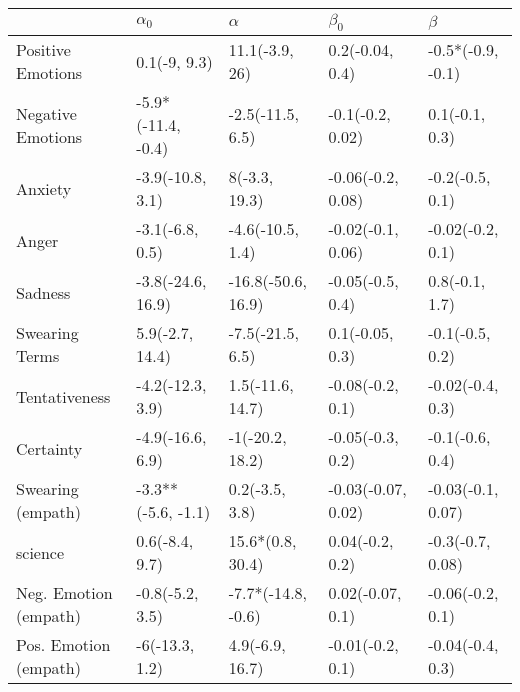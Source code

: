 \begin{tabular}{lllll}
\toprule
{} &          $\alpha_0$ &            $\alpha$ &           $\beta_0$ &            $\beta$ \\
\midrule
Positive Emotions     &        0.1(-9, 9.3) &      11.1(-3.9, 26) &     0.2(-0.04, 0.4) &  -0.5*(-0.9, -0.1) \\
Negative Emotions     &  -5.9*(-11.4, -0.4) &    -2.5(-11.5, 6.5) &    -0.1(-0.2, 0.02) &     0.1(-0.1, 0.3) \\
Anxiety               &    -3.9(-10.8, 3.1) &       8(-3.3, 19.3) &   -0.06(-0.2, 0.08) &    -0.2(-0.5, 0.1) \\
Anger                 &     -3.1(-6.8, 0.5) &    -4.6(-10.5, 1.4) &   -0.02(-0.1, 0.06) &   -0.02(-0.2, 0.1) \\
Sadness               &   -3.8(-24.6, 16.9) &  -16.8(-50.6, 16.9) &    -0.05(-0.5, 0.4) &     0.8(-0.1, 1.7) \\
Swearing Terms        &     5.9(-2.7, 14.4) &    -7.5(-21.5, 6.5) &     0.1(-0.05, 0.3) &    -0.1(-0.5, 0.2) \\
Tentativeness         &    -4.2(-12.3, 3.9) &    1.5(-11.6, 14.7) &    -0.08(-0.2, 0.1) &   -0.02(-0.4, 0.3) \\
Certainty             &    -4.9(-16.6, 6.9) &     -1(-20.2, 18.2) &    -0.05(-0.3, 0.2) &    -0.1(-0.6, 0.4) \\
Swearing (empath)     &  -3.3**(-5.6, -1.1) &      0.2(-3.5, 3.8) &  -0.03(-0.07, 0.02) &  -0.03(-0.1, 0.07) \\
science               &      0.6(-8.4, 9.7) &    15.6*(0.8, 30.4) &     0.04(-0.2, 0.2) &   -0.3(-0.7, 0.08) \\
Neg. Emotion (empath) &     -0.8(-5.2, 3.5) &  -7.7*(-14.8, -0.6) &    0.02(-0.07, 0.1) &   -0.06(-0.2, 0.1) \\
Pos. Emotion (empath) &      -6(-13.3, 1.2) &     4.9(-6.9, 16.7) &    -0.01(-0.2, 0.1) &   -0.04(-0.4, 0.3) \\
\bottomrule
\end{tabular}
